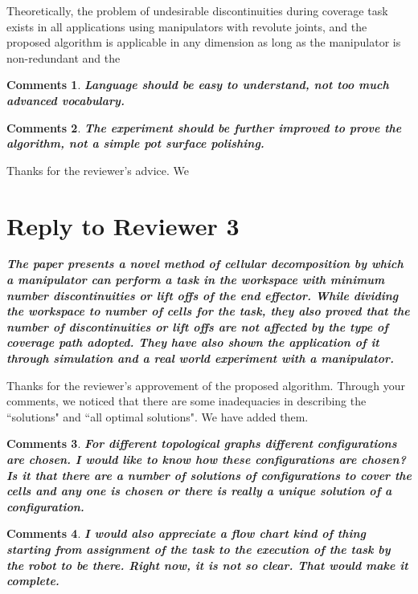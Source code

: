 \documentclass[utf8]{article}
\newtheorem{theorem}{Comments}[section]
\begin{document}
Theoretically, the problem of undesirable discontinuities during coverage task exists in all applications using manipulators with revolute joints, and the proposed algorithm is applicable in any dimension as long as the manipulator is non-redundant and the 

\begin{theorem}
\textbf{Language should be easy to understand, not too much advanced vocabulary.
}
\end{theorem}


\begin{theorem}
\textbf{The experiment should be further improved to prove the algorithm, not a simple pot surface polishing.
}
\end{theorem}

Thanks for the reviewer's advice. We 

\section{Reply to Reviewer 3}
\textbf{\textit{
The paper presents a novel method of cellular decomposition by which a manipulator can perform a task in the workspace with minimum number discontinuities or lift offs of the end effector. While dividing the workspace to number of cells for the task, they also proved that the number of discontinuities or lift offs are not affected by the type of coverage path adopted. They have also shown the application of it through simulation and a real world experiment with a manipulator.
}}

Thanks for the reviewer's approvement of the proposed algorithm. Through your comments, we noticed that there are some inadequacies in describing the ``solutions" and ``all optimal solutions". We have added them.  

\begin{theorem}
\textbf{
For different topological graphs different configurations are chosen. I would like to know how these configurations are chosen? Is it that there are a number of solutions of configurations to cover the cells and any one is chosen or there is really a unique solution of a configuration.
}
\end{theorem}



\begin{theorem}
\textbf{I would also appreciate a flow chart kind of thing starting from assignment of the task to the execution of the task by the robot to be there. Right now, it is not so clear. That would make it complete.}
\end{theorem}
\end{document}

